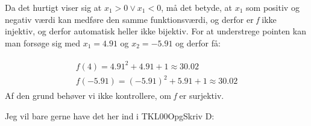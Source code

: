 \documentclass{article}
\begin{document}
Da det hurtigt viser sig at $x_1> 0 \vee x_1 < 0 $, må det betyde, at $x_1$ som positiv og negativ værdi kan medføre den samme funktionsværdi, og derfor er \emph{f} ikke injektiv, og derfor automatisk heller ikke bijektiv. For at understrege pointen kan man forsøge sig med $x_1 = 4.91$ og $x_2 = -5.91$ og derfor få:

\begin{align*}
\begin{split}
f(4) = 4.91^2 + 4.91 + 1 \approx 30.02  \\
f(-5.91) = (-5.91)^2 + 5.91 + 1 \approx 30.02
\end{split}
\end{align*}
Af den grund behøver vi ikke kontrollere, om \emph{f} er surjektiv.




Jeg vil bare gerne have det her ind i TKL00OpgSkriv D:
\end{document}

